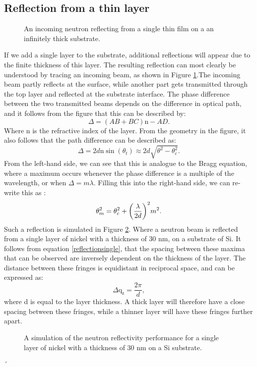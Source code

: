 \subsection{Reflection from a thin layer}
\begin{figure}[b]
	\centering
	\def\svgwidth{\textwidth}
	
	\caption{An incoming neutron reflecting from a single thin film on a an infinitely thick substrate.}
	\label{singlelayersketch}
\end{figure}
If we add a single layer to the substrate, additional reflections will appear due to the finite thickness of this layer. The resulting reflection can most clearly be understood by tracing an incoming beam, as shown in Figure \ref{singlelayersketch}.The incoming beam partly reflects at the surface, while another part gets transmitted through the top layer and reflected at the substrate interface. The phase difference between the two transmitted beams depends on the difference in optical path, and it follows from the figure that this can be described by:
\begin{equation}
	\Delta = (AB + BC) \textrm{n}  - AD.
\end{equation}
Where n is the refractive index of the layer. From the geometry in the figure, it also follows that the path difference can be described as:
\begin{equation}
	\Delta = 2d \textrm{n} \sin (\theta_t) \approx 2d \sqrt{\theta^2 - \theta_c^2}.
\end{equation}
From the left-hand side, we can see that this is analogue to the Bragg equation, where a maximum occurs whenever the phase difference is a multiple of the wavelength, or when $\Delta= m \lambda$. Filling this into the right-hand side, we can re-write this as \cite{birkholz}:
\begin{equation}\label{reflectionsingle}
	\theta_m^2 = \theta_c^2 + \qty(\frac{\lambda}{2d})^2m^2.
\end{equation}
Such a reflection is simulated in Figure \ref{simulated_singlelayer}. Where a neutron beam is reflected from a single layer of nickel with a thickness of 30 nm, on a substrate of Si. It follows from equation \ref{reflectionsingle}, that the spacing between these maxima that can be observed are inversely dependent on the thickness of the layer. The distance between these fringes is equidistant in reciprocal space, and can be expressed as:
\begin{equation}
	\Delta \textrm{q}_\textrm{z} = \frac{2\pi}{d},
\end{equation}
where d is equal to the layer thickness. A thick layer will therefore have a close spacing between these fringes, while a thinner layer will have these fringes further apart.
\begin{figure}
	\centering
	\def\svgwidth{\textwidth}
	
	\caption{A simulation of the neutron reflectivity performance for a single layer of nickel with a thickness of 30 nm on a Si substrate.}
	\label{simulated_singlelayer}
\end{figure}
\clearpage´
